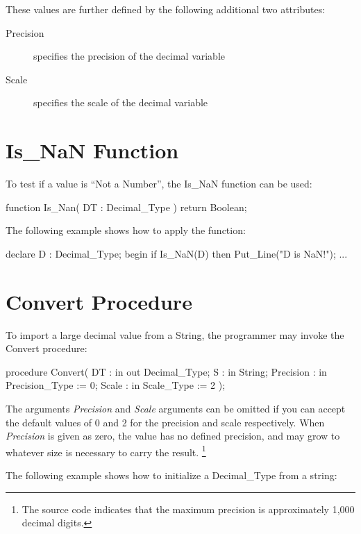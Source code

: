 \documentclass[english,letterpaper]{book}
\begin{document}
These values are further defined by the following additional two attributes:

\begin{description}
   \item [Precision] specifies the precision of the decimal variable
   \item [Scale] specifies the scale of the decimal variable
\end{description}

\section{Is\_NaN Function}

To test if a value is ``Not a Number'', the Is\_NaN function can
be used:

\begin{Code}
function Is_Nan(
   DT : Decimal_Type
) return Boolean;
\end{Code}

The following example shows how to apply the function:

\begin{Example}
declare
   D : Decimal_Type;
begin
   if Is_NaN(D) then
   Put_Line("D is NaN!");
   ...
\end{Example}

\section{Convert Procedure}

To import a large decimal value from a String, the programmer may
invoke the Convert procedure:

\begin{Code}
procedure Convert(
   DT :        in out Decimal_Type;
   S :         in     String;
   Precision : in     Precision_Type := 0;
   Scale :     in     Scale_Type := 2
);
\end{Code}

The arguments \emph{Precision} and \emph{Scale} arguments can be omitted
if you can accept the default values of 0 and 2 for the precision
and scale respectively. When \emph{Precision} is given as zero, the
value has no defined precision, and may grow to whatever size is necessary
to carry the result.%
\footnote{The source code indicates that the maximum precision is approximately
1,000 decimal digits.}

The following example shows how to initialize a Decimal\_Type from
a string:
\end{document}
